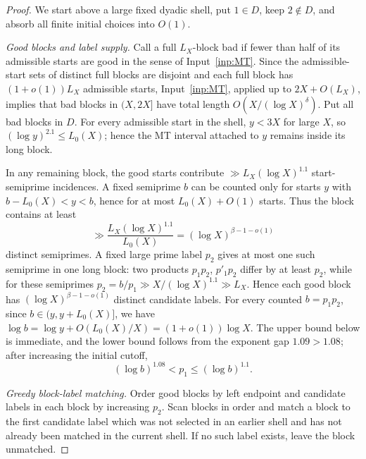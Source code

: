 \documentclass[11pt]{article}
\theoremstyle{definition}
\newcommand{\1}{\mathbf 1}
\begin{document}
\begin{proof}
We start above a large fixed dyadic shell, put \(1\in D\), keep \(2\notin D\),
and absorb all finite initial choices into \(O(1)\).

\smallskip
\noindent\emph{Good blocks and label supply.}
Call a full \(L_X\)-block bad if fewer than half of its admissible starts are
good in the sense of Input~\ref{inp:MT}.  Since the admissible-start sets of
distinct full blocks are disjoint and each full block has \((1+o(1))L_X\)
admissible starts, Input~\ref{inp:MT}, applied up to \(2X+O(L_X)\), implies
that bad blocks in \((X,2X]\) have total length \(O(X/(\log X)^\delta)\).
Put all bad blocks in \(D\).
For every admissible start in the shell, \(y<3X\) for large \(X\), so
\((\log y)^{2.1}\le L_0(X)\); hence the MT interval attached to \(y\) remains
inside its long block.

In any remaining block, the good starts contribute
\(\gg L_X(\log X)^{1.1}\) start-semiprime incidences.  A fixed semiprime
\(b\) can be counted only for starts \(y\) with \(b-L_0(X)<y<b\), hence for at
most \(L_0(X)+O(1)\) starts.  Thus the block contains at least
\[
  \gg \frac{L_X(\log X)^{1.1}}{L_0(X)}
  =(\log X)^{\beta-1-o(1)}
\]
distinct semiprimes.  A fixed large prime label \(p_2\) gives at most one such
semiprime in one long block: two products \(p_1p_2\), \(p'_1p_2\) differ by
at least \(p_2\), while for these semiprimes
\(p_2=b/p_1\gg X/(\log X)^{1.1}\gg L_X\).  Hence each good block has
\((\log X)^{\beta-1-o(1)}\) distinct candidate labels.
For every counted \(b=p_1p_2\), since \(b\in(y,y+L_0(X)]\), we have
\(\log b=\log y+O(L_0(X)/X)=(1+o(1))\log X\).  The upper bound below is
immediate, and the lower bound follows from the exponent gap \(1.09>1.08\);
after increasing the initial cutoff,
\[
  (\log b)^{1.08}<p_1\le(\log b)^{1.1}.
\]

\smallskip
\noindent\emph{Greedy block-label matching.}
Order good blocks by left endpoint and candidate labels in each block by
increasing \(p_2\).  Scan blocks in order and match a block to the first
candidate label which was not selected in an earlier shell and has not already
been matched in the current shell.  If no such label exists, leave the block
unmatched.


\end{proof}
\end{document}
